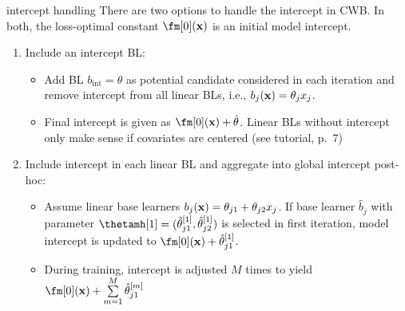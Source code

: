 \documentclass[11pt,compress,t,notes=noshow, xcolor=table]{beamer}
\begin{document}

\begin{frame2}{intercept handling}
There are two options to handle the intercept in CWB. In both, the loss-optimal constant $\fm[0](\xv)$ is an initial model intercept. \\
\begin{enumerate}
\setlength{\itemsep}{0.8em}
\item {\small Include an intercept BL}:
  \begin{itemize}
    \setlength{\itemsep}{0.8em}
    \item {\footnotesize Add BL $b_{\text{int}} = \theta$ as potential candidate considered in each iteration and remove intercept from all linear BLs, i.e., $b_j(\mathbf{x}) = \theta_j x_j$.}
    \item {\footnotesize Final intercept is given as $\fm[0](\xv) + \hat{\theta}$. Linear BLs without intercept only make sense if covariates are centered (see  tutorial, p.~7)}
  \end{itemize}
  
  
  \item {\small Include intercept in each linear BL and aggregate into global intercept post-hoc}:
  \begin{itemize} \setlength{\itemsep}{0.8em}
  \item  {\footnotesize Assume linear base learners $b_j(\mathbf{x}) = \theta_{j1} + \theta_{j2} x_j$. %
  If base learner $\hat{b}_j$ with parameter $\thetamh[1] = (\hat{\theta}_{j1}^{[1]}, \hat{\theta}_{j2}^{[1]})$ is selected in first iteration, model intercept is updated to $\fm[0](\xv) + \hat{\theta}_{j1}^{[1]}$.}
    \item {\footnotesize During training, intercept is adjusted $M$ times to yield $\fm[0](\xv) + \sum\limits_{m=1}^M %
    \hat{\theta}^{[m]}_{j1}$}
    \end{itemize}
\end{enumerate}



\end{frame2}
\end{document}
